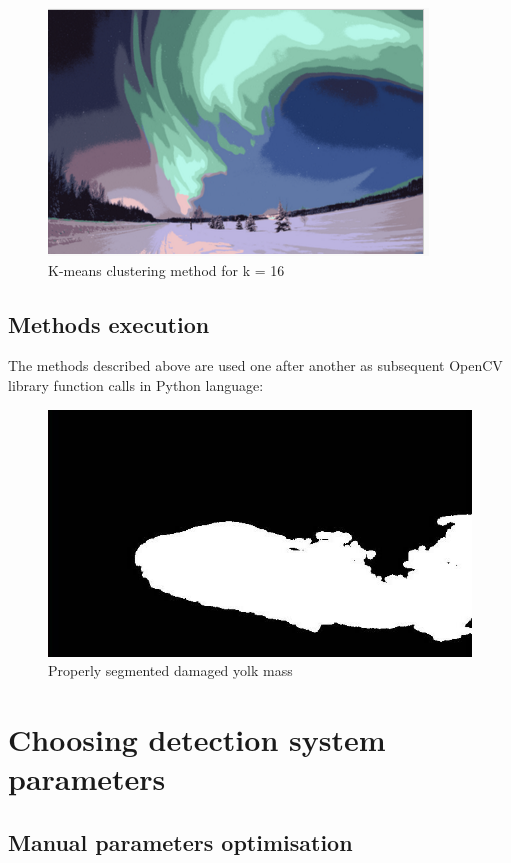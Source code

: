 \documentclass[12pt,twoside,a4paper]{article}
\begin{document}
\begin{figure}[H]
\centering
\includegraphics[width=0.4\paperwidth]{kmeans}
\caption{K-means clustering method for k = 16\cite{segm}}
\end{figure}
\subsection{Methods execution}
The methods described above are used one after another as subsequent OpenCV library function calls in Python language:


\begin{figure}[H]
\centering
\includegraphics[width=0.4\paperwidth]{bad}
\caption{Properly segmented damaged yolk mass}
\end{figure}

\section{Choosing detection system parameters}
\subsection{Manual parameters optimisation}
\end{document}

